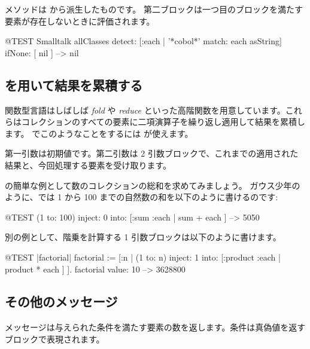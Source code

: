 \documentclass[a4paper,10pt,twoside]{book}
\begin{document}

 メソッドは  から派生したものです。
第二ブロックは一つ目のブロックを満たす要素が存在しないときに評価されます。

\begin{code}{@TEST}
Smalltalk allClasses detect: [:each | '*cobol*' match: each asString] ifNone: [ nil ] --> nil
\end{code}

\subsection{ を用いて結果を累積する}
関数型言語はしばしば \emph{fold} や \emph{reduce} といった高階関数を用意しています。これらはコレクションのすべての要素に二項演算子を繰り返し適用して結果を累積します。
\pharo でこのようなことをするには  が使えます。

第一引数は初期値です。第二引数は 2 引数ブロックで、これまでの適用された結果と、今回処理する要素を受け取ります。

 の簡単な例として数のコレクションの総和を求めてみましょう。
ガウス少年のように、\pharo では 1 から 100 までの自然数の和を以下のように書けるのです:
\begin{code}{@TEST}
(1 to: 100) inject: 0 into: [:sum :each | sum + each ] --> 5050
\end{code}

別の例として、階乗を計算する 1 引数ブロックは以下のように書けます。
\begin{code}{@TEST |factorial|}
factorial := [:n | (1 to: n) inject: 1 into: [:product :each | product * each ] ].
factorial value: 10 --> 3628800
\end{code}

\subsection{その他のメッセージ}

\paragraph{}   メッセージは与えられた条件を満たす要素の数を返します。条件は真偽値を返すブロックで表現されます。
\end{document}
